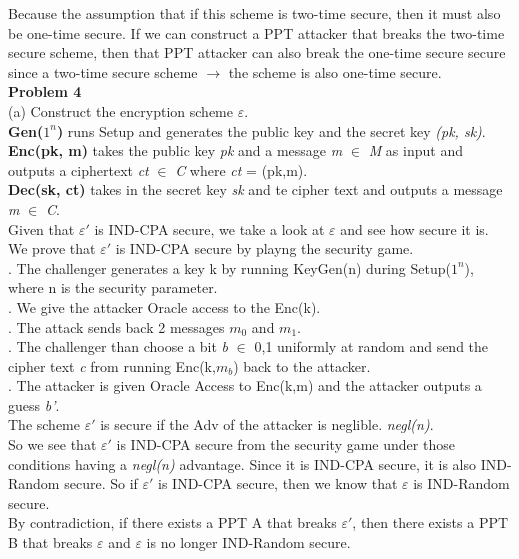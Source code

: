 \documentclass[10pt]{article}
\begin{document}
\indent Because the assumption that if this scheme is two-time secure, then it must also be one-time secure. If we can construct a PPT attacker that breaks the two-time secure scheme, then that PPT attacker can also break the one-time secure secure since a two-time secure scheme $\to$ the scheme is also one-time secure.\\

\noindent \large \textbf{Problem 4}\\
(a) Construct the encryption scheme $\varepsilon$.\\

\indent \textbf{Gen($1^{n}$)} runs Setup and generates the public key and the secret key \emph{(pk, sk)}.\\
\indent \textbf{Enc(pk, m)} takes the public key \emph{pk} and a message \emph{m} $\in$ \emph{M} as input and outputs a ciphertext \emph{ct} $\in$ \emph{C} where \emph{ct} = (pk,m).\\
\indent 
\indent \textbf{Dec(sk, ct)} takes in the secret key \emph{sk} and te cipher text and outputs a message \emph{m} $\in$ \emph{C}.\\

\indent Given that $\varepsilon'$ is IND-CPA secure, we take a look at $\varepsilon$ and see how secure it is.\\

\indent We prove that $\varepsilon'$ is IND-CPA secure by playng the security game.\\
. The challenger generates a key k by running KeyGen(n) during Setup($1^{n}$), where n is the security parameter.\\
. We give the attacker Oracle access to the Enc(k).\\
. The attack sends back 2 messages $m_{0}$ and $m_{1}$.\\
. The challenger than choose a bit \emph{b} $\in$ {0,1} uniformly at random and send the cipher text \emph{c} from running Enc(k,$m_{b}$) back to the attacker.\\
. The attacker is given Oracle Access to Enc(k,m) and the attacker outputs a guess \emph{b'}.\\
\indent The scheme $\varepsilon'$ is secure if the Adv of the attacker is neglible. \emph{negl(n)}.\\

\indent So we see that $\varepsilon'$ is IND-CPA secure from the security game under those conditions having a \emph{negl(n)} advantage. Since it is IND-CPA secure, it is also IND-Random secure. So if $\varepsilon'$ is IND-CPA secure, then we know that $\varepsilon$ is IND-Random secure.\\
\indent By contradiction, if there exists a PPT A that breaks $\varepsilon'$, then there exists a PPT B that breaks $\varepsilon$ and $\varepsilon$ is no longer IND-Random secure.\\
\end{document}
